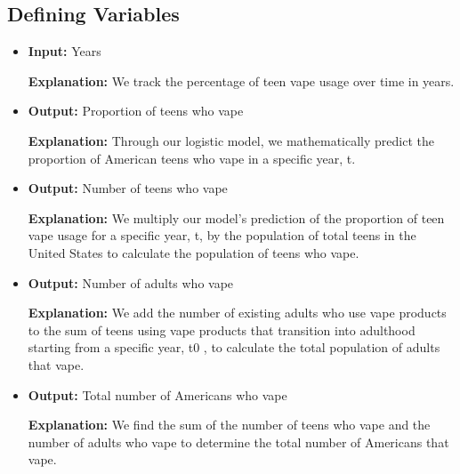 \documentclass[12pt]{article}
\newcommand{\expl}{\textbf{Explanation: }}
\begin{document}
\subsection{Defining Variables}
\begin{itemize}
\item \textbf{Input:} Years

\expl We track the percentage of teen vape usage over time in years.

\item \textbf{Output:} Proportion of teens who vape

\expl Through our logistic model, we mathematically predict the proportion of American teens who vape in a specific year, t.

\item \textbf{Output:} Number of teens who vape

\expl We multiply our model’s prediction of the proportion of teen vape usage for a specific year, t, by the population of total teens in the United States to calculate the population of teens who vape.

\item \textbf{Output:} Number of adults who vape

\expl We add the number of existing adults who use vape products to the sum of teens using vape products that transition into adulthood starting from a specific year, t0 , to calculate the total population of adults that vape.

\item \textbf{Output:} Total number of Americans who vape

\expl We find the sum of the number of teens who vape and the number of adults who vape to determine the total number of Americans that vape.

\end{itemize}
\end{document}
